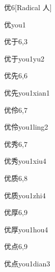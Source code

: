 \begin{entry}{优}{6}[Radical 人]
  \begin{phonetics}{优}{you1}
  \end{phonetics}
\end{entry}

\begin{entry}{优于}{6,3}
  \begin{phonetics}{优于}{you1yu2}
  \end{phonetics}
\end{entry}

\begin{entry}{优先}{6,6}
  \begin{phonetics}{优先}{you1xian1}
  \end{phonetics}
\end{entry}

\begin{entry}{优伶}{6,7}
  \begin{phonetics}{优伶}{you1ling2}
  \end{phonetics}
\end{entry}

\begin{entry}{优秀}{6,7}
  \begin{phonetics}{优秀}{you1xiu4}
  \end{phonetics}
\end{entry}

\begin{entry}{优质}{6,8}
  \begin{phonetics}{优质}{you1zhi4}
  \end{phonetics}
\end{entry}

\begin{entry}{优厚}{6,9}
  \begin{phonetics}{优厚}{you1hou4}
  \end{phonetics}
\end{entry}

\begin{entry}{优点}{6,9}
  \begin{phonetics}{优点}{you1dian3}
  \end{phonetics}
\end{entry}

